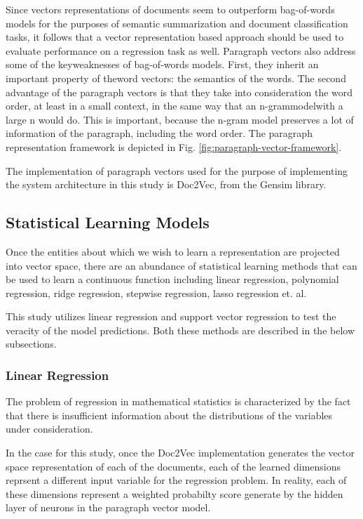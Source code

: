 \documentclass[conference]{IEEEtran}
\begin{document}
Since vectors representations of documents seem to outperform bag-of-words models for the purposes of semantic summarization and document classification tasks, it follows that a vector representation based approach should be used to evaluate performance on a regression task as well. Paragraph vectors also address some of the keyweaknesses of bag-of-words models. First, they inherit an important property of theword vectors: the semantics of the words. The second advantage of the paragraph vectors is that they take into consideration the word order, at least in a small context, in the same way that an n-grammodelwith a large n would do. This is important, because the n-gram model preserves a lot of information of the paragraph, including the word order\cite{le2014distributed}. The paragraph representation framework is depicted in Fig. \ref{fig:paragraph-vector-framework}.

The implementation of paragraph vectors used for the purpose of implementing the system architecture in this study is Doc2Vec, from the Gensim library\cite{doc2vec_api}.


\subsection{Statistical Learning Models}
Once the entities about which we wish to learn a representation are projected into vector space, there are an abundance of statistical learning methods that can be used to learn a continuous function including linear regression, polynomial regression, ridge regression, stepwise regression, lasso regression et. al.

This study utilizes linear regression and support vector regression to test the veracity of the model predictions. Both these methods are described in the below subsections.

\subsubsection{Linear Regression}
The problem of regression in mathematical statistics is characterized by the fact that there is insufficient information about the distributions of the variables under consideration\cite{regression_analysis}.

In the case for this study, once the Doc2Vec implementation generates the vector space representation of each of the documents, each of the learned dimensions reprsent a different input variable for the regression problem. In reality, each of these dimensions represent a weighted probabilty score generate by the hidden layer of neurons in the paragraph vector model.
\end{document}
